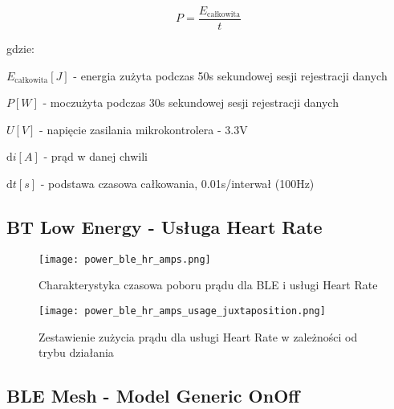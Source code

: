 \begin{equation} \label{power_equation}
P = \frac{E_{\text{całkowita}}}{t}
\end{equation}

gdzie:

\begin{description}
\item $E_{\text{całkowita}} [J]$ - energia zużyta podczas 50s sekundowej sesji rejestracji danych
\item $P [W]$ - moczużyta podczas 30s sekundowej sesji rejestracji danych
\item $U [V]$ - napięcie zasilania mikrokontrolera - 3.3V
\item $\mathrm{d}i [A]$ - prąd w danej chwili
\item $\mathrm{d}t [s]$ - podstawa czasowa całkowania, 0.01s/interwał (100Hz)
\end{description}


\lipsum[1-3]
\subsection{BT Low Energy - Usługa Heart Rate}

\lipsum[1-3]
\begin{figure}[!htb]
	\centering \texttt{[image: power\_ble\_hr\_amps.png]}
	\caption{Charakterystyka czasowa poboru prądu dla BLE i usługi Heart Rate}
	\label{rys:power_ble_hr_amps}
\end{figure}

\lipsum[1-2]
\begin{figure}[!htb]
	\centering \texttt{[image: power\_ble\_hr\_amps\_usage\_juxtaposition.png]}
	\caption{Zestawienie zużycia prądu dla usługi Heart Rate w zależności od trybu działania}
	\label{rys:power_ble_hr_amps_usage_juxtaposition}
\end{figure}
\lipsum[1-3]

\subsection{BLE Mesh - Model Generic OnOff}

